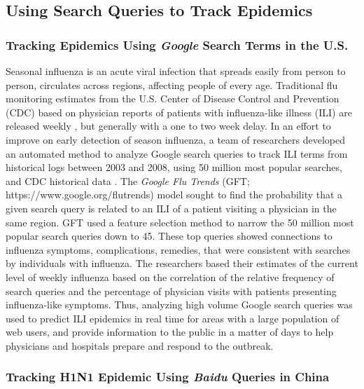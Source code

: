\documentclass[sigconf]{acmart}
\begin{document}
\subsection{Using Search Queries to Track Epidemics}

\subsubsection{Tracking Epidemics Using {\itshape Google} Search Terms in the U.S.}

Seasonal influenza is an acute viral infection that spreads easily from person to 
person, circulates across regions, affecting people of every age. Traditional 
flu monitoring estimates from the U.S. Center of Disease Control and Prevention 
(CDC) based on physician reports of patients with influenza-like illness (ILI) are 
released weekly \cite{cdc17}, but generally with a one to two week delay. In an effort 
to improve on early detection of season influenza, a team of researchers developed an 
automated method to analyze Google search queries to track ILI terms from historical 
logs between 2003 and 2008, using 50 million most popular searches, and CDC historical 
data \cite{ginsburg09}. The {\it Google Flu Trends} (GFT; https://www.google.org/flutrends)
model sought to find the probability that a given search query is related to an ILI of a 
patient visiting a physician in the same region. GFT used a feature selection method to 
narrow  the 50 million most popular search queries down to 45. These top queries showed 
connections to influenza symptoms, complications, remedies, that were consistent with 
searches by individuals with influenza. The researchers based their estimates of the 
current level of weekly influenza based on the correlation of the relative frequency 
of search queries and the percentage of physician visits with patients presenting 
influenza-like symptoms. Thus, analyzing high volume Google search queries was used 
to predict ILI epidemics in real time for areas with a large population of web users, 
and provide information to the public in a matter of days to help physicians and 
hospitals prepare and respond to the outbreak. 

\subsubsection{Tracking H1N1 Epidemic Using {\itshape Baidu} Queries in China}
\end{document}
